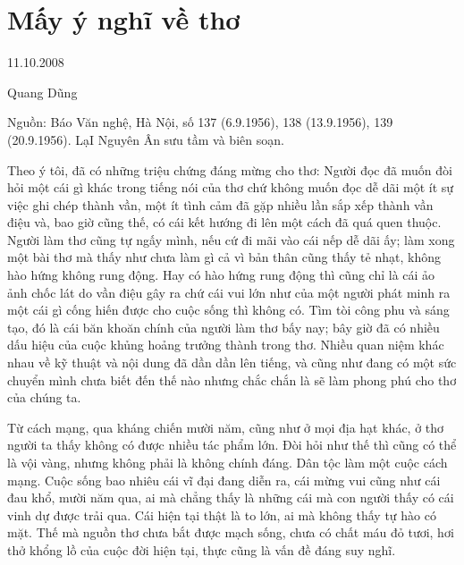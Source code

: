 \documentclass[../main.tex]{subfiles}
\begin{document}
\chapter{Mấy ý nghĩ về thơ }

\begin{metadata}

\begin{flushright}11.10.2008\end{flushright}

Quang Dũng

Nguồn: Báo Văn nghệ, Hà Nội, số 137 (6.9.1956), 138 (13.9.1956), 139 (20.9.1956). LạI Nguyên Ân sưu tầm và biên soạn. 

\end{metadata}

\begin{multicols}{2}

Theo ý tôi, đã có những triệu chứng đáng mừng cho thơ: Người đọc đã muốn đòi hỏi một cái gì khác trong tiếng nói của thơ chứ không muốn đọc dễ dãi một ít sự việc ghi chép thành vần, một ít tình cảm đã gặp nhiều lần sắp xếp thành vần điệu và, bao giờ cũng thế, có cái kết hướng đi lên một cách đã quá quen thuộc. Người làm thơ cũng tự ngấy mình, nếu cứ đi mãi vào cái nếp dễ dãi ấy; làm xong một bài thơ mà thấy như chưa làm gì cả vì bản thân cũng thấy tẻ nhạt, không hào hứng không rung động. Hay có hào hứng rung động thì cũng chỉ là cái ảo ảnh chốc lát do vần điệu gây ra chứ cái vui lớn như của một người phát minh ra một cái gì cống hiến được cho cuộc sống thì không có. Tìm tòi công phu và sáng tạo, đó là cái băn khoăn chính của người làm thơ bấy nay; bây giờ đã có nhiều dấu hiệu của cuộc khủng hoảng trưởng thành trong thơ. Nhiều quan niệm khác nhau về kỹ thuật và nội dung đã dần dần lên tiếng, và cũng như đang có một sức chuyển mình chưa biết đến thế nào nhưng chắc chắn là sẽ làm phong phú cho thơ của chúng ta. 
 
Từ cách mạng, qua kháng chiến mười năm, cũng như ở mọi địa hạt khác, ở thơ người ta thấy không có được nhiều tác phẩm lớn. Đòi hỏi như thế thì cũng có thể là vội vàng, nhưng không phải là không chính đáng. Dân tộc làm một cuộc cách mạng. Cuộc sống bao nhiêu cái vĩ đại đang diễn ra, cái mừng vui cũng như cái đau khổ, mười năm qua, ai mà chẳng thấy là những cái mà con người thấy có cái vinh dự được trải qua. Cái hiện tại thật là to lớn, ai mà không thấy tự hào có mặt. Thế mà nguồn thơ chưa bắt được mạch sống, chưa có chất máu đỏ tươi, hơi thở khổng lồ của cuộc đời hiện tại, thực cũng là vấn đề đáng suy nghĩ. 
 

\end{multicols}
\end{document}
